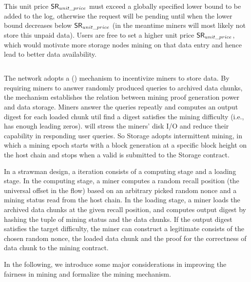 This unit price $\mathsf{SR}_{unit\_price}$ must exceed a globally specified lower bound to be added to the log, otherwise the request will be pending until when the lower bound decreases below $\mathsf{SR}_{unit\_price}$ (in the meantime miners will most likely not store this unpaid data).
Users are free to set a higher unit price $\mathsf{SR}_{unit\_price}$,
which would motivate more storage nodes mining on that data entry and hence lead to better data availability.



\subsection{\proof}

The \project network adopts a \proof (\sproof) mechanism to incentivize miners to store data.
%
By requiring miners to answer randomly produced queries to archived data chunks, the \sproof mechanism establishes the relation between mining proof generation power and data storage.
%
Miners answer the queries repeatly and computes an output digest for each loaded chunk util find a digest satisfies the mining difficulty (i.e., has enough leading zeros). 
%
{\sproof} will stress the miners' disk I/O and reduce their capability in responding user queries.
%
So \projabbrev Storage adopts intermittent mining, in which 
%
a mining epoch starts with a block generation at a specific block height on the host chain and stops when a valid {\sproof} is submitted to the \projabbrev Storage contract. 

In a strawman design, a \sproof iteration consists of a computing stage and a loading stage. 
%
In the computing stage, a miner computes a random recall position (the universal offset in the flow) based on an arbitrary picked random nonce and a mining status read from the host chain.
%
In the loading stage, a miner loads the archived data chunks at the given recall position, and computes output digest by hashing the tuple of mining status and the data chunks. 
%
If the output digest satisfies the target difficulty, the miner can construct a legitimate \sproof consists of the chosen random nonce, the loaded data chunk and the proof for the correctness of data chunk to the mining contract. 

In the following, we introduce some major considerations in improving the fairness in {\sproof} mining and formalize the {\sproof} mining mechanism. 

%


